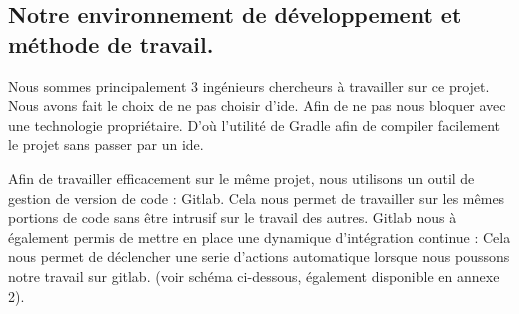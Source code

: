 \justify
\subsection{Notre environnement de développement et méthode de travail.}

Nous sommes principalement 3 ingénieurs chercheurs à travailler sur ce projet. Nous avons fait le choix de ne pas choisir d'\gls{ide}. Afin de ne pas nous bloquer avec une technologie propriétaire. D'où l'utilité de Gradle afin de compiler facilement le projet sans passer par un \gls{ide}.

Afin de travailler efficacement sur le même projet, nous utilisons un outil de gestion de version de code : Gitlab.
Cela nous permet de travailler sur les mêmes portions de code sans être intrusif sur le travail des autres.
Gitlab nous à également permis de mettre en place une dynamique d'intégration continue :
Cela nous permet de déclencher une serie d'actions automatique lorsque nous poussons notre travail sur gitlab. (voir schéma ci-dessous, également disponible en annexe 2).


